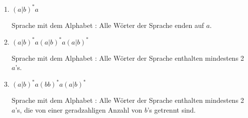 \documentclass{lehramt-informatik-aufgabe}
\begin{document}
\begin{enumerate}
\begin{enumerate}
\item $(a | b)^*a$

\begin{liAntwort}
Sprache mit dem Alphabet : Alle Wörter der Sprache
enden auf $a$.
\end{liAntwort}

\item $(a|b)^*a(a|b)^*a(a|b)^*$

\begin{liAntwort}
Sprache mit dem Alphabet : Alle Wörter der Sprache
enthalten mindestens 2 $a$’s.
\end{liAntwort}

\item $(a|b)^*a(bb)^*a(a|b)^*$

\begin{liAntwort}
Sprache mit dem Alphabet : Alle Wörter der Sprache
enthalten mindestens 2 $a$’s, die von einer geradzahligen Anzahl von
$b$’s getrennt sind.
\end{liAntwort}
\end{enumerate}
\end{enumerate}
\end{document}
